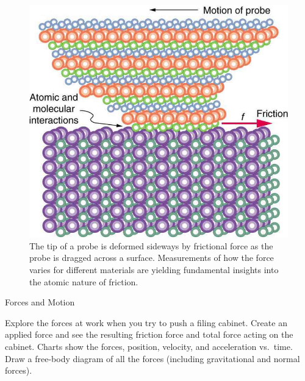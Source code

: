 \documentclass[
]{book}
\newenvironment{note}{}{}
\begin{document}
\begin{figure}
\hypertarget{import-auto-id1165298744656}{%
\centering
\includegraphics{images/Figure_06_01_05a.jpg}
\caption{The tip of a probe is deformed sideways by frictional force as the
probe is dragged across a surface. Measurements of how the force varies
for different materials are yielding fundamental insights into the
atomic nature of
friction.}\label{import-auto-id1165298744656}
}
\end{figure}

\hypertarget{eip-440}{}
\begin{note}

Forces and Motion

Explore the forces at work when you try to push a filing cabinet. Create
an applied force and see the resulting friction force and total force
acting on the cabinet. Charts show the forces, position, velocity, and
acceleration vs.~time. Draw a free-body diagram of all the forces
(including gravitational and normal forces). {\hfill\break
}

\hypertarget{fs-id1167067199007}{}

\end{note}
\end{document}
